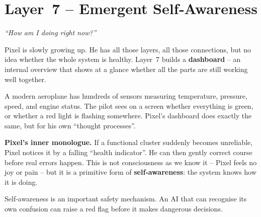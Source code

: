 \section{Layer~7 – Emergent Self‑Awareness}
\label{sec:layer7}

\begin{tcolorbox}[colback=blue!5, colframe=blue!60, title=\textbf{Superpower: The Watcher}]
\begin{center}
\textit{“How am I doing right now?”}
\end{center}
\end{tcolorbox}

Pixel is slowly growing up.  He has all those layers, all those
connections, but no idea whether the whole system is healthy.  Layer~7
builds a \textbf{dashboard} – an internal overview that shows at a
glance whether all the parts are still working well together.

\begin{tcolorbox}[colback=yellow!5, colframe=yellow!80, title=Real‑life analogy]
A modern aeroplane has hundreds of sensors measuring temperature,
pressure, speed, and engine status.  The pilot sees on a screen
whether everything is green, or whether a red light is flashing
somewhere.  Pixel’s dashboard does exactly the same, but for his own
“thought processes”.
\end{tcolorbox}

\textbf{Pixel’s inner monologue.}
If a functional cluster suddenly becomes unreliable, Pixel notices it
by a falling “health indicator”.  He can then gently correct course
before real errors happen.  This is not consciousness as we know it –
Pixel feels no joy or pain – but it is a primitive form of
\textbf{self‑awareness}: the system knows how it is doing.

Self‑awareness is an important safety mechanism.  An AI that can
recognise its own confusion can raise a red flag before it makes
dangerous decisions.